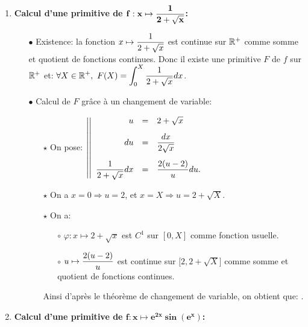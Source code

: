 \documentclass[a4paper, 11pt,reqno]{article}
\begin{document}
\begin{correction}
\begin{enumerate}
		\item \textbf{Calcul d'une primitive de $\mathbf{f: x\mapsto \displaystyle\frac{1}{2+\sqrt{x}}} $:}
		      \begin{itemize}
			      \item[$\bullet$] Existence: la fonction $x\mapsto  \displaystyle\frac{1}{2+\sqrt{x}} $ est continue sur $\mathbb{R}^+$ comme somme et quotient de fonctions continues. Donc il existe une primitive $F$ de $f$ sur $\mathbb{R}^+$ et: $\forall  \displaystyle X\in\mathbb{R}^+,\ F(X)=\int_0^X \displaystyle\frac{1}{2+\sqrt{x}} dx$.
			      \item[$\bullet$] Calcul de $F$ gr\^{a}ce \`{a} un changement de variable:
			            \begin{itemize}
				            \item[$\star$] On pose: $\left| \left|\begin{array}{rll}
						                  u                            & = & 2+\sqrt{x}\vsec                \\
						                  du                           & = & \ddp\frac{dx}{2\sqrt{x}} \vsec \\
						                  \ddp\frac{1}{2+\sqrt{x}}  dx & = & \ddp\frac{2(u-2)}{u}du.
					                  \end{array}\right.\right.$
				            \item[$\star$] On a $x=0 \Rightarrow u=2$, et $x=X \Rightarrow u= 2+\sqrt{X}$.
				            \item[$\star$] On a:
				                  \begin{itemize}
					                  \item[$\circ$] $\varphi: x\mapsto 2+\sqrt{x}$ est $C^1$ sur $\left\lbrack 0,X \right\rbrack$ comme fonction usuelle.
					                  \item[$\circ$] $u\mapsto  \displaystyle\frac{2(u-2)}{u} $ est continue sur $\lbrack 2,2+\sqrt{X}\rbrack$ comme somme et quotient de fonctions continues.
				                  \end{itemize}
				                  Ainsi d'apr\`{e}s le th\'eor\`{e}me de changement de variable, on obtient que:
				                  .
			            \end{itemize}
		      \end{itemize}
		\item \textbf{Calcul d'une primitive de $\mathbf{f: x\mapsto e^{2x}\sin{(e^x)} }$:}

\end{enumerate}
\end{correction}
\end{document}
